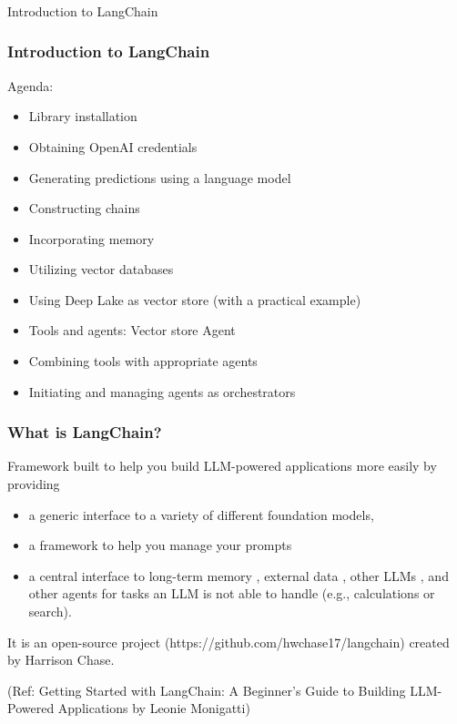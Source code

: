 \begin{frame}[fragile]\frametitle{}
\begin{center}
{\Large Introduction to LangChain}
\end{center}
\end{frame}

\begin{frame}[fragile]\frametitle{Introduction to LangChain}

Agenda:
\begin{itemize}
    \item Library installation
    \item Obtaining OpenAI credentials
    \item Generating predictions using a language model
    \item Constructing chains
    \item Incorporating memory
    \item Utilizing vector databases
    \item Using Deep Lake as vector store (with a practical example)
    \item Tools and agents: Vector store Agent
    \item Combining tools with appropriate agents
    \item Initiating and managing agents as orchestrators
\end{itemize}

\end{frame}

\begin{frame}[fragile]\frametitle{What is LangChain?}

Framework built to help you build LLM-powered applications more easily by providing 

\begin{itemize}
\item a generic interface to a variety of different foundation models,
\item a framework to help you manage your prompts 
\item a central interface to long-term memory , external data , other LLMs , and other agents for tasks an LLM is not able to handle (e.g., calculations or search).
\end{itemize}

It is an open-source project (https://github.com/hwchase17/langchain) created by Harrison Chase.

{\tiny (Ref: Getting Started with LangChain: A Beginner’s Guide to Building LLM-Powered Applications by Leonie Monigatti)}
\end{frame}



